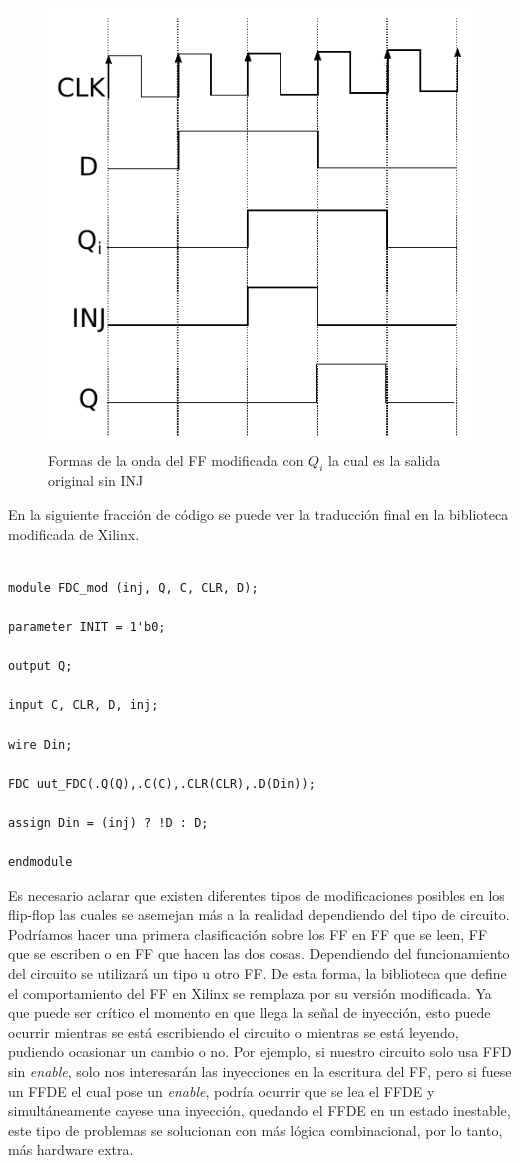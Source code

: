 \begin{figure}[H]
	\centering
	\includegraphics[width=0.48 \textwidth]{img/dessin.pdf}
	\caption{Formas de la onda del FF modificada con  $Q_{i}$ la cual es la salida original sin INJ }
	\label{FFS}
\end{figure}

En la siguiente fracción de  código se puede ver la traducción final en la biblioteca modificada de Xilinx.
\lstset{frame=tb,
  language=VHDL,
  aboveskip=3mm,
  belowskip=3mm,
  showstringspaces=false,
  columns=flexible,
  basicstyle=\ttfamily,
  numbers=none,
  breakatwhitespace=true,
  tabsize=2
}

\begin{lstlisting}

module FDC_mod (inj, Q, C, CLR, D);

parameter INIT = 1'b0;

output Q;

input C, CLR, D, inj;

wire Din;

FDC uut_FDC(.Q(Q),.C(C),.CLR(CLR),.D(Din));

assign Din = (inj) ? !D : D;

endmodule

\end{lstlisting}

Es necesario  aclarar que existen diferentes tipos de modificaciones posibles en los flip-flop las cuales se asemejan más a la realidad dependiendo del tipo de circuito. Podríamos hacer una primera clasificación sobre los FF en FF que se leen, FF que  se escriben o en FF que hacen las dos cosas. Dependiendo del funcionamiento del circuito se utilizará un tipo u otro FF. De esta forma, la biblioteca que define el comportamiento del FF en Xilinx se remplaza por su versión modificada. Ya que puede ser crítico el momento en que llega la señal de inyección, esto puede ocurrir mientras se está escribiendo el circuito o mientras se está leyendo, pudiendo ocasionar un cambio o no. Por ejemplo, si nuestro circuito solo usa FFD sin \textit{enable}, solo nos interesarán las inyecciones en la escritura del FF, pero si fuese un FFDE el cual pose un \textit{enable}, podría ocurrir que se lea  el FFDE y simultáneamente cayese una inyección, quedando el FFDE en un estado inestable, este tipo de problemas se solucionan con  más lógica combinacional, por lo tanto, más hardware extra.

